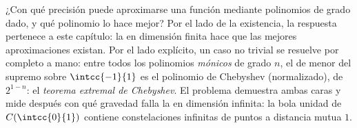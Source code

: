 ¿Con qué precisión puede aproximarse una función mediante polinomios
de grado dado, y qué polinomio lo hace mejor? Por el lado de la
existencia, la respuesta pertenece a este capítulo: la  en
dimensión finita hace que las mejores aproximaciones existan. Por el
lado explícito, un caso no trivial se resuelve por completo a mano:
entre todos los polinomios \emph{mónicos} de grado $n$, el de menor
 del supremo sobre $\intcc{-1}{1}$ es el polinomio de Chebyshev
(normalizado), de  $2^{1-n}$: el \emph{teorema extremal de
Chebyshev}. El problema demuestra ambas caras y mide después con qué
gravedad falla la  en dimensión infinita: la bola unidad de
$C(\intcc{0}{1})$ contiene constelaciones infinitas de puntos a
distancia mutua $1$.

